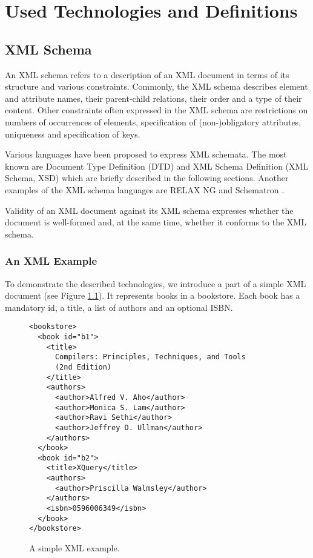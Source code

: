 \chapter{Used Technologies and Definitions}


\section{XML Schema}
An XML schema refers to a description of an XML document in terms of its structure and various constraints. Commonly, the XML schema describes element and attribute names, their parent-child relations, their order and a type of their content. Other constraints often expressed in the XML schema are restrictions on numbers of occurrences of elements, specification of (non-)obligatory attributes, uniqueness and specification of keys.

Various languages have been proposed to express XML schemata. The most known are Document Type Definition (DTD) \cite{Bray:08:EML} and XML Schema Definition (XML Schema, XSD) \cite{Walmsley:04:XSP, Thompson:04:XSP, Malhotra:04:XSP} which are briefly described in the following sections. Another examples of the XML schema languages are RELAX NG \cite{relaxng} and  Schematron \cite{schematron}.

Validity of an XML document against its XML schema expresses whether the document is well-formed \cite{Bray:08:EML} and, at the same time, whether it conforms to the XML schema.

\subsection{An XML Example}
To demonstrate the described technologies, we introduce a part of a simple XML document (see Figure \ref{FIG_a_simple_xml_example}). It represents books in a bookstore. Each book has a mandatory id, a title, a list of authors and an optional ISBN.

\begin{figure}
\caption{A simple XML example.}
\label{FIG_a_simple_xml_example}
\begin{verbatim}
<bookstore>
  <book id="b1">
    <title>
      Compilers: Principles, Techniques, and Tools
      (2nd Edition)
    </title>
    <authors>
      <author>Alfred V. Aho</author>
      <author>Monica S. Lam</author>
      <author>Ravi Sethi</author>
      <author>Jeffrey D. Ullman</author>
    </authors>
  </book>
  <book id="b2">
    <title>XQuery</title>
    <authors>
      <author>Priscilla Walmsley</author>
    </authors>
    <isbn>0596006349</isbn>
  </book>
</bookstore>
\end{verbatim}
\end{figure}

